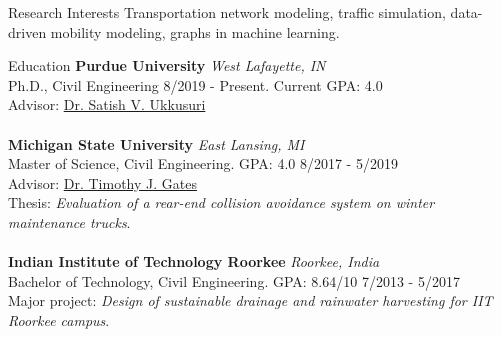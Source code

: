 \documentclass{res} %
\begin{document}
    \begin{rSection}{Research Interests}
        Transportation network modeling, traffic simulation, data-driven mobility modeling, graphs in machine learning.
    \end{rSection}

    \begin{rSection}{Education}
    {\bf Purdue University} \hfill {\em West Lafayette, IN}
    \\ Ph.D., Civil Engineering \hfill {8/2019 - Present}. Current GPA: 4.0
    \\ Advisor: \href{http://www.satishukkusuri.com/}{Dr. Satish V. Ukkusuri} \\
    \\ {\bf Michigan State University} \hfill {\em East Lansing, MI}
    \\ Master of Science, Civil Engineering. GPA: 4.0 \hfill {8/2017 - 5/2019}
    \\ Advisor: \href{https://www.egr.msu.edu/people/profile/gatestim}{Dr. Timothy J. Gates}
    \\ Thesis: \emph{Evaluation of a rear-end collision avoidance system on winter maintenance trucks}. \\
    \\ {\bf Indian Institute of Technology Roorkee} \hfill {\em Roorkee, India}
    \\ Bachelor of Technology, Civil Engineering. GPA: 8.64/10 \hfill {7/2013 - 5/2017}
    \\ Major project: \emph{Design of sustainable drainage and rainwater harvesting for IIT Roorkee campus}.
    \end{rSection}
\end{document}
